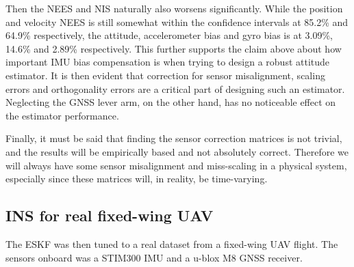 Then the NEES and NIS naturally also worsens significantly. While the position and velocity NEES is still somewhat within the confidence intervals at 85.2\% and 64.9\% respectively, the attitude, accelerometer bias and gyro bias is at 3.09\%, 14.6\% and 2.89\% respectively. This further supports the claim above about how important IMU bias compensation is when trying to design a robust attitude estimator. It is then evident that correction for sensor misalignment, scaling errors and orthogonality errors are a critical part of designing such an estimator. Neglecting the GNSS lever arm, on the other hand, has no noticeable effect on the estimator performance.

Finally, it must be said that finding the sensor correction matrices is not trivial, and the results will be empirically based and not absolutely correct. Therefore we will always have some sensor misalignment and miss-scaling in a physical system, especially since these matrices will, in reality, be time-varying.

\subsection{INS for real fixed-wing UAV}


The ESKF was then tuned to a real dataset from a fixed-wing UAV flight. The sensors onboard was a STIM300 IMU and a u-blox M8 GNSS receiver. 


